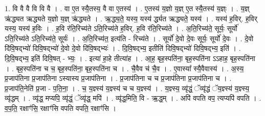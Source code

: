 \documentclass[17pt]{extarticle}
\begin{document}
1. वि वै वै वि वि वै । . वा ए॒त स्यै॒तस्य॒ वै वा ए॒तस्य॑ । . ए॒तस्य॑ य॒ज्ञो य॒ज्ञ् ए॒त स्यै॒तस्य॑ य॒ज्ञ्ः । . य॒ज्ञ् ऋ॑द्ध्यत ऋद्ध्यते य॒ज्ञो य॒ज्ञ् ऋ॑द्ध्यते । . ऋ॒द्ध्य॒ते॒ यस्य॒ यस्य॑ र्द्ध्यत ऋद्ध्यते॒ यस्य॑ । . यस्य॑ ह॒विर्. ह॒विर् यस्य॒ यस्य॑ ह॒विः । . ह॒वि र॑ति॒रिच्य॑ते ऽति॒रिच्य॑ते ह॒विर्. ह॒वि र॑ति॒रिच्य॑ते । . अ॒ति॒रिच्य॑ते॒ सूर्यः॒ सूर्यो॑ ऽति॒रिच्य॑ते ऽति॒रिच्य॑ते॒ सूर्यः॑ । . अ॒ति॒रिच्य॑त॒ इत्य॑ति - रिच्य॑ते । . सूर्यो॑ दे॒वो दे॒वः सूर्यः॒ सूर्यो॑ दे॒वः । . दे॒वो दि॑वि॒षद्भ्यो॑ दिवि॒षद्भ्यो॑ दे॒वो दे॒वो दि॑वि॒षद्भ्यः॑ । . दि॒वि॒षद्भ्य॒ इतीति॑ दिवि॒षद्भ्यो॑ दिवि॒षद्भ्य॒ इति॑ । . दि॒वि॒षद्भ्य॒ इति॑ दिवि॒षत् - भ्यः॒ । . इत्या॑ हा॒हे तीत्या॑ह । . आ॒ह॒ बृह॒स्पति॑ना॒ बृह॒स्पति॑ना ऽऽहाह॒ बृह॒स्पति॑ना । . बृह॒स्पति॑ना च च॒ बृह॒स्पति॑ना॒ बृह॒स्पति॑ना च । . चै॒वैव च॑ चै॒व । . ए॒वास्या᳚ स्यै॒वैवास्य॑ । . अ॒स्य॒ प्र॒जाप॑तिना प्र॒जाप॑तिना ऽस्यास्य प्र॒जाप॑तिना । . प्र॒जाप॑तिना च च प्र॒जाप॑तिना प्र॒जाप॑तिना च । . प्र॒जाप॑ति॒नेति॑ प्र॒जा - प॒ति॒ना॒ । . च॒ य॒ज्ञ्स्य॑ य॒ज्ञ्स्य॑ च च य॒ज्ञ्स्य॑ । . य॒ज्ञ्स्य॒ व्यृ॑द्धं॒ ॅव्यृ॑द्धं ॅय॒ज्ञ्स्य॑ य॒ज्ञ्स्य॒ व्यृ॑द्धम् । . व्यृ॑द्ध॒ मप्यपि॒ व्यृ॑द्धं॒ ॅव्यृ॑द्ध॒ मपि॑ । . व्यृ॑द्ध॒मिति॒ वि - ऋ॒द्ध॒म् । . अपि॑ वपति वप॒ त्यप्यपि॑ वपति । . व॒प॒ति॒ रक्षाꣳ॑सि॒ रक्षाꣳ॑सि वपति वपति॒ रक्षाꣳ॑सि । \newline
\end{document}
